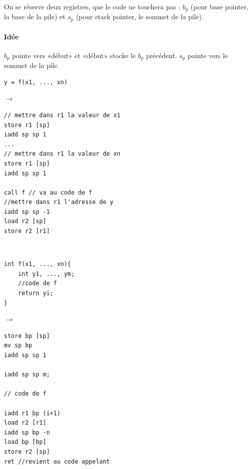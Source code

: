 On se réserve deux registres, que le code ne touchera pas : $b_p$ (pour base pointer, la base de la pile) et $s_p$ (pour stack pointer, le sommet de la pile).

\paragraph{Idée} $b_p$ pointe vers «début» et «début» stocke le $b_p$ précédent. $s_p$ pointe vers le sommet de la pile.

\begin{minipage}{0.3\linewidth}
\begin{lstlisting}
y = f(x1, ..., xn)
\end{lstlisting}
\end{minipage} \qquad $\longrightarrow$ \qquad
\begin{minipage}{0.5\linewidth}
	\begin{lstlisting}
// mettre dans r1 la valeur de x1
store r1 [sp]
iadd sp sp 1
...
// mettre dans r1 la valeur de xn
store r1 [sp]
iadd sp sp 1

call f // va au code de f
//mettre dans r1 l'adresse de y
iadd sp sp -1
load r2 [sp]
store r2 [r1]
	\end{lstlisting}
\end{minipage}

\enspace\\
\begin{minipage}{0.3\linewidth}
	\begin{lstlisting}
int f(x1, ..., xn){
    int y1, ..., ym;
    //code de f
    return yi;
}
\end{lstlisting}
\end{minipage} \qquad $\longrightarrow$ \qquad \begin{minipage}{0.5\linewidth}
\begin{lstlisting}
store bp [sp]
mv sp bp
iadd sp sp 1

iadd sp sp m;

// code de f

iadd r1 bp (i+1)
load r2 [r1]
iadd sp bp -n
load bp [bp]
store r2 [sp]
ret //revient au code appelant
\end{lstlisting}
\end{minipage}